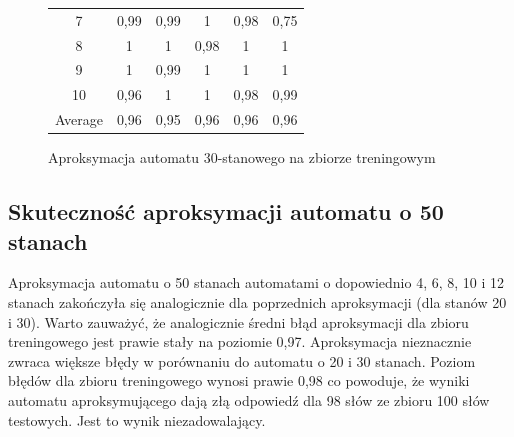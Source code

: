 \documentclass[runningheads,a4paper]{llncs}
\begin{document}
\begin{figure}[!htb]
\begin{tabular}{@{}cccccc@{}}
7       & 0,99     & 0,99     & 1        & 0,98      & 0,75    \\
8       & 1        & 1        & 0,98     & 1         & 1    \\
9       & 1        & 0,99     & 1        & 1         & 1 \\
10      & 0,96     & 1        & 1        & 0,98      & 0,99  \\ \bottomrule
Average & 0,96    & 0,95    & 0,96    & 0,96     & 0,96  \\ \bottomrule
\end{tabular}
\vspace{4mm}
\endminipage\hfill
\caption{Aproksymacja automatu 30-stanowego na zbiorze treningowym}
\end{figure}

\FloatBarrier
\subsection{Skuteczność aproksymacji automatu o 50 stanach}

Aproksymacja automatu o 50 stanach automatami o dopowiednio 4, 6, 8, 10 i 12 stanach zakończyła się analogicznie dla poprzednich aproksymacji (dla stanów 20 i 30). Warto zauważyć, że analogicznie średni błąd aproksymacji dla zbioru treningowego jest prawie stały na poziomie 0,97. Aproksymacja nieznacznie zwraca większe błędy w porównaniu do automatu o 20 i 30 stanach. Poziom błędów dla zbioru treningowego wynosi prawie 0,98 co powoduje, że wyniki automatu aproksymującego dają złą odpowiedź dla 98 słów ze zbioru 100 słów testowych. Jest to wynik niezadowalający.\\
\end{document}
